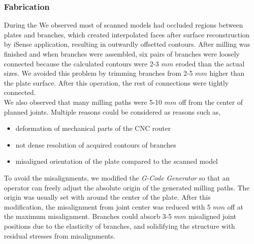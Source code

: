 \subsubsection*{Fabrication}
During the 
We observed most of scanned models had occluded regions between plates and branches, which created interpolated faces after surface reconstruction by iSense application, resulting in outwardly offsetted contours. After milling was finished and when branches were assembled, six pairs of branches were loosely connected because the calculated contours were 2-3 $mm$ eroded than the actual sizes.
We avoided this problem by trimming branches from 2-5 $mm$ higher than the plate surface.
After this operation, the rest of connections were tightly connected. \\

We also observed that many milling paths were 5-10 $mm$ off from the center of planned joints.
Multiple reasons could be considered as reasons such as,

\begin{itemize}
  \item{deformation of mechanical parts of the CNC router}
  \item{not dense resolution of acquired contours of branches}
  \item{misaligned orientation of the plate compared to the scanned model}
\end{itemize}

To avoid the misalignments, we modified the \textit{G-Code Generator} so that an operator can freely adjust the absolute origin of the generated milling paths.
The origin was usually set with around the center of the plate.
After this modification, the misalignment from joint center was reduced with 5 $mm$ off at the maximum misalignment.
Branches could absorb 3-5 $mm$ misaligned joint positions due to the elasticity of branches, and solidifying the structure with residual stresses from misalignments.




